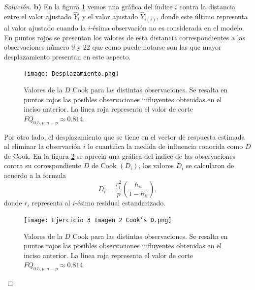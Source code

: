 \documentclass[10.5pt,notitlepage]{article}
\newenvironment{solucion}
  {\begin{proof}[Solución]}
  {\end{proof}}
\newcommand{\pare}[1]{\left( #1 \right)}
\theoremstyle{plain}
\begin{document}
\begin{solucion}
\noindent \textbf{b)} En la figura \ref{fig:chingatumadredembelé} vemos una gráfica del índice \(i\) contra la distancia entre el valor ajustado \(\hat{Y}_{i}\) y el valor ajustado \(\hat{Y}_{i(i)}\), donde este último representa al valor ajustado cuando la \(i\)-ésima observación no es considerada en el modelo. En puntos rojos se presentan los valores de esta distancia correspondientes a las observaciones número \(9\) y \(22\) que como puede notarse son las que mayor desplazamiento presentan en este aspecto. 
\begin{figure}[htb]
 \centering
 \texttt{[image: Desplazamiento.png]}
 \caption{Valores de la \(D\) Cook para las distintas observaciones. Se resalta en puntos rojos las posibles observaciones influyentes obtenidas en el inciso anterior. La linea roja representa el valor de corte \(FQ_{0.5,p,n-p}\approx 0.814\).}
\label{fig:chingatumadredembelé}
\end{figure}
Por otro lado, el desplazamiento que se tiene en el vector de respuesta estimada al eliminar la observación \(i\) lo cuantifica la medida de influencia conocida como \(D\) de Cook. En la figura \ref{fig:10} se aprecia una gráfica del indice de las observaciones contra su correspondiente \(D\) de Cook \((D_i)\), los valores \(D_i\) se calcularon de acuerdo a la formula 
\begin{equation*}
    D_i = \frac{r_{i}^2}{p}\pare{\frac{h_{ii}}{1 - h_{ii}}},
\end{equation*}
donde \(r_i\) representa al \(i\)-ésimo residual estandarizado.  
\begin{figure}[htb]
 \centering
 \texttt{[image: Ejercicio 3 Imagen 2 Cook's D.png]}
 \caption{Valores de la \(D\) Cook para las distintas observaciones. Se resalta en puntos rojos las posibles observaciones influyentes obtenidas en el inciso anterior. La linea roja representa el valor de corte \(FQ_{0.5,p,n-p}\approx 0.814\).}
\label{fig:10}
\end{figure}

\end{solucion}
\end{document}
